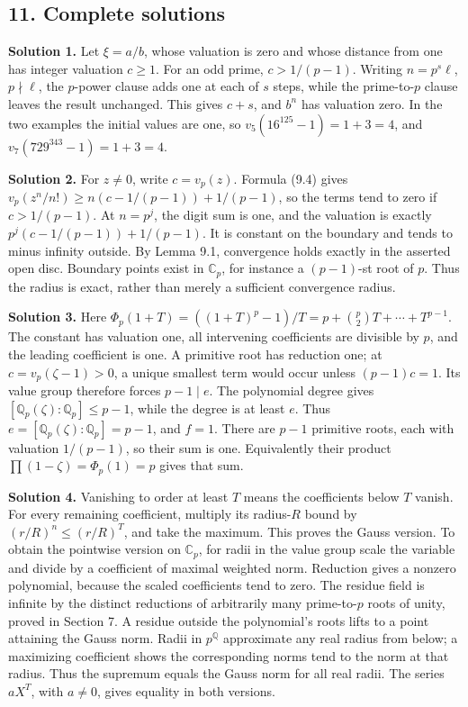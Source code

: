 \documentclass[
  11pt,
  a4paper,
]{article}
\begin{document}
\subsection{11. Complete solutions}\label{complete-solutions}

\textbf{Solution 1.} Let \(\xi=a/b\), whose valuation is zero and whose
distance from one has integer valuation \(c\ge1\). For an odd prime,
\(c>1/(p-1)\). Writing \(n=p^s\ell\), \(p\nmid\ell\), the \(p\)-power
clause adds one at each of \(s\) steps, while the prime-to-\(p\) clause
leaves the result unchanged. This gives \(c+s\), and \(b^n\) has
valuation zero. In the two examples the initial values are one, so
\(v_5(16^{125}-1)=1+3=4\), and \(v_7(729^{343}-1)=1+3=4\).

\textbf{Solution 2.} For \(z\ne0\), write \(c=v_p(z)\). Formula (9.4)
gives \(v_p(z^n/n!)\ge n(c-1/(p-1))+1/(p-1)\), so the terms tend to zero
if \(c>1/(p-1)\). At \(n=p^j\), the digit sum is one, and the valuation
is exactly \(p^j(c-1/(p-1))+1/(p-1)\). It is constant on the boundary
and tends to minus infinity outside. By Lemma 9.1, convergence holds
exactly in the asserted open disc. Boundary points exist in
\(\mathbb C_p\), for instance a \((p-1)\)-st root of \(p\). Thus the
radius is exact, rather than merely a sufficient convergence radius.

\textbf{Solution 3.} Here
\(\Phi_p(1+T)=((1+T)^p-1)/T=p+\binom p2T+\cdots+T^{p-1}\). The constant
has valuation one, all intervening coefficients are divisible by \(p\),
and the leading coefficient is one. A primitive root has reduction one;
at \(c=v_p(\zeta-1)>0\), a unique smallest term would occur unless
\((p-1)c=1\). Its value group therefore forces \(p-1\mid e\). The
polynomial degree gives \([\mathbb Q_p(\zeta):\mathbb Q_p]\le p-1\),
while the degree is at least \(e\). Thus
\(e=[\mathbb Q_p(\zeta):\mathbb Q_p]=p-1\), and \(f=1\). There are
\(p-1\) primitive roots, each with valuation \(1/(p-1)\), so their sum
is one. Equivalently their product \(\prod(1-\zeta)=\Phi_p(1)=p\) gives
that sum.

\textbf{Solution 4.} Vanishing to order at least \(T\) means the
coefficients below \(T\) vanish. For every remaining coefficient,
multiply its radius-\(R\) bound by \((r/R)^n\le(r/R)^T\), and take the
maximum. This proves the Gauss version. To obtain the pointwise version
on \(\mathbb C_p\), for radii in the value group scale the variable and
divide by a coefficient of maximal weighted norm. Reduction gives a
nonzero polynomial, because the scaled coefficients tend to zero. The
residue field is infinite by the distinct reductions of arbitrarily many
prime-to-\(p\) roots of unity, proved in Section 7. A residue outside
the polynomial's roots lifts to a point attaining the Gauss norm. Radii
in \(p^{\mathbb Q}\) approximate any real radius from below; a
maximizing coefficient shows the corresponding norms tend to the norm at
that radius. Thus the supremum equals the Gauss norm for all real radii.
The series \(aX^T\), with \(a\ne0\), gives equality in both versions.
\end{document}
